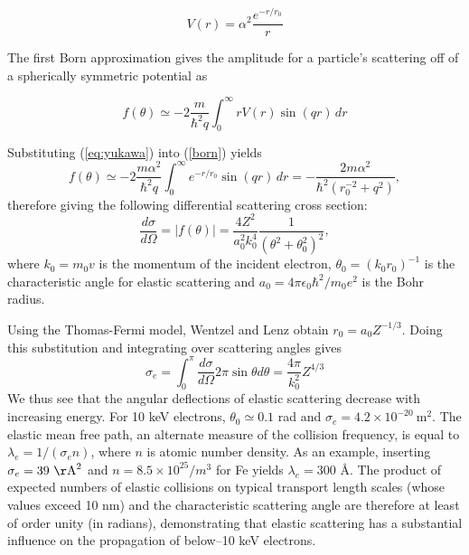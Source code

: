 \documentclass [11pt, proquest, article] {uwthesis}[2016/11/22]
\begin{document}
\begin{equation}\label{eq:yukawa} 
V(r) = \alpha^2 \frac{e^{-r/r_0}}{r}
\end{equation}


The first Born approximation gives the amplitude for a particle's scattering off of a spherically symmetric potential as

 \begin{equation}\label{born}
	f(\theta) \simeq -2 \frac{m}{\hbar^2 q} \int_0^\infty r V(r) \sin (qr)\, dr
\end{equation}

Substituting (\ref{eq:yukawa}) into (\ref{born}) yields 
\begin{equation}
	f(\theta) \simeq -2 \frac{m \alpha^2}{\hbar^2 q} \int_0^\infty e^{-r/r_0} \sin (qr)\, dr = -\frac{2m\alpha^2}{\hbar^2 (r_0^{-2} + q^2)},
\end{equation}
therefore giving the following differential scattering cross section:
$$
\frac{d\sigma}{d\Omega} = |f(\theta)| = \frac{4 Z^2}{a_0^2 k_0^4} \frac{1}{(\theta^2 + \theta_0^2)^2},
$$
where $k_0 = m_0 v$ is the momentum of the incident electron, $\theta_0 = (k_0 r_0)^{-1}$ is the characteristic angle for elastic scattering and $a_0 = 4 \pi \epsilon_0 \hbar^2/m_0 e^2$ is the Bohr radius.

Using the Thomas-Fermi model, Wentzel and Lenz obtain $r_0 = a_0 Z^{-1/3}$. \cite{wentzel1926theorie, lenz1954streuung} Doing this substitution and integrating over scattering angles gives
\begin{equation}
\sigma_e = \int_0^\pi \frac{d\sigma}{d\Omega} 2 \pi \sin \theta d \theta = \frac{4 \pi}{k_0^2} Z^{4/3}
\end{equation}
We thus see that the angular deflections of elastic scattering decrease with increasing energy. For 10 keV electrons, $\theta_0 \simeq 0.1$ rad and $\sigma_e = 4.2 \times 10^{-20}~\mathrm{m}^2$. The elastic mean free path, an alternate measure of the collision frequency, is equal to $\lambda_e = 1/(\sigma_e n)$, where $n$ is atomic number density. As an example, inserting $\sigma_e = 39~\mathrm{\AA}^2$ and $n = 8.5\times 10^{25}/m^3$ for Fe yields $\lambda_e = 300$ \AA. The product of expected numbers of elastic collisions on typical transport length scales (whose values exceed 10 nm) and the characteristic scattering angle are therefore at least of order unity (in radians), demonstrating that elastic scattering has a substantial influence on the propagation of below--10 keV electrons.
\end{document}
